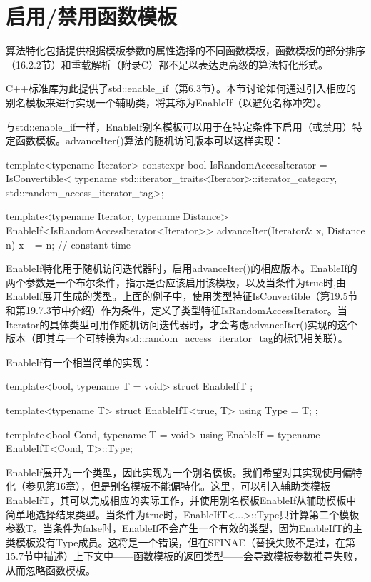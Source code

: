 \section{启用/禁用函数模板}

算法特化包括提供根据模板参数的属性选择的不同函数模板，函数模板的部分排序（16.2.2节）和重载解析（附录C）都不足以表达更高级的算法特化形式。

C++标准库为此提供了std::enable\_if（第6.3节）。本节讨论如何通过引入相应的别名模板来进行实现一个辅助类，将其称为EnableIf（以避免名称冲突）。

与std::enable\_if一样，EnableIf别名模板可以用于在特定条件下启用（或禁用）特定函数模板。advanceIter()算法的随机访问版本可以这样实现：

\begin{cpp}
template<typename Iterator>
constexpr bool IsRandomAccessIterator =
	IsConvertible<
		typename std::iterator_traits<Iterator>::iterator_category,
		std::random_access_iterator_tag>;
		
template<typename Iterator, typename Distance>
EnableIf<IsRandomAccessIterator<Iterator>>
advanceIter(Iterator& x, Distance n) {
	x += n; // constant time
}
\end{cpp}

EnableIf特化用于随机访问迭代器时，启用advanceIter()的相应版本。EnableIf的两个参数是一个布尔条件，指示是否应该启用该模板，以及当条件为true时,由EnableIf展开生成的类型。上面的例子中，使用类型特征IsConvertible（第19.5节和第19.7.3节中介绍）作为条件，定义了类型特征IsRandomAccessIterator。当Iterator的具体类型可用作随机访问迭代器时，才会考虑advanceIter()实现的这个版本（即其与一个可转换为std::random\_access\_iterator\_tag的标记相关联）。

EnableIf有一个相当简单的实现：

\begin{cpp}
template<bool, typename T = void>
struct EnableIfT {
};

template<typename T>
struct EnableIfT<true, T> {
	using Type = T;
};

template<bool Cond, typename T = void>
using EnableIf = typename EnableIfT<Cond, T>::Type;
\end{cpp}

EnableIf展开为一个类型，因此实现为一个别名模板。我们希望对其实现使用偏特化（参见第16章），但是别名模板不能偏特化。这里，可以引入辅助类模板EnableIfT，其可以完成相应的实际工作，并使用别名模板EnableIf从辅助模板中简单地选择结果类型。当条件为true时，EnableIfT<...>::Type只计算第二个模板参数T。当条件为false时，EnableIf不会产生一个有效的类型，因为EnableIfT的主类模板没有Type成员。这将是一个错误，但在SFINAE（替换失败不是过，在第15.7节中描述）上下文中——函数模板的返回类型——会导致模板参数推导失败，从而忽略函数模板。

